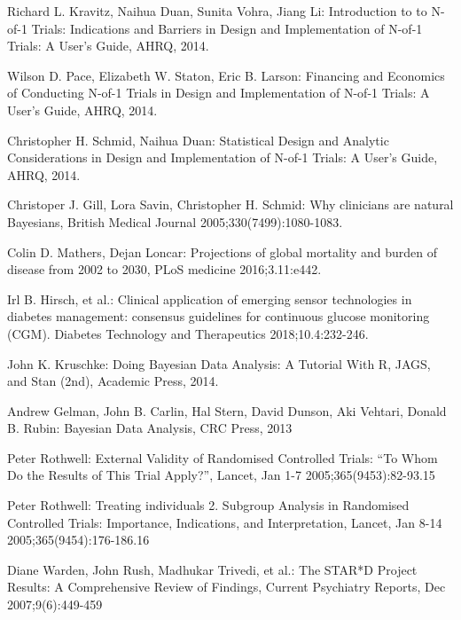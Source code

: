 \documentclass[12pt,a4paper,leqno]{report}
\theoremstyle{plain}
\theoremstyle{definition}
\theoremstyle{remark}
\begin{document}
\begin{thebibliography}{4}

    Richard L. Kravitz, Naihua Duan, Sunita Vohra, Jiang Li: Introduction to to
    N-of-1 Trials: Indications and Barriers in Design and Implementation of
    N-of-1 Trials: A User's Guide, AHRQ, 2014.

    Wilson D. Pace, Elizabeth W. Staton, Eric B. Larson: Financing and Economics
    of Conducting N-of-1 Trials in Design and Implementation of N-of-1 Trials: A
    User's Guide, AHRQ, 2014.

    Christopher H. Schmid, Naihua Duan: Statistical Design and Analytic
    Considerations in Design and Implementation of N-of-1 Trials: A User's
    Guide, AHRQ, 2014.

    Christoper J. Gill, Lora Savin, Christopher H. Schmid: Why clinicians are
    natural Bayesians, British Medical Journal 2005;330(7499):1080-1083.

    Colin D. Mathers, Dejan Loncar: Projections of global mortality and burden
    of disease from 2002 to 2030, PLoS medicine 2016;3.11:e442.

    Irl B. Hirsch, et al.: Clinical application of emerging sensor technologies
    in diabetes management: consensus guidelines for continuous glucose
    monitoring (CGM). Diabetes Technology and Therapeutics 2018;10.4:232-246.

    John K. Kruschke: Doing Bayesian Data Analysis: A Tutorial With R, JAGS, and Stan
    (2nd), Academic Press, 2014.

    Andrew Gelman, John B. Carlin, Hal Stern, David Dunson, Aki Vehtari, Donald B.
    Rubin: Bayesian Data Analysis, CRC Press, 2013

    Peter Rothwell: External Validity of Randomised Controlled Trials: “To Whom Do the
    Results of This Trial Apply?”, Lancet, Jan 1-7 2005;365(9453):82-93.15

    Peter Rothwell: Treating individuals 2. Subgroup Analysis in Randomised Controlled
    Trials: Importance, Indications, and Interpretation, Lancet, Jan 8-14
    2005;365(9454):176-186.16

    Diane Warden, John Rush, Madhukar Trivedi, et al.: The STAR*D Project Results: A Comprehensive Review of Findings, Current Psychiatry Reports, Dec 2007;9(6):449-459


\end{thebibliography}
\end{document}

